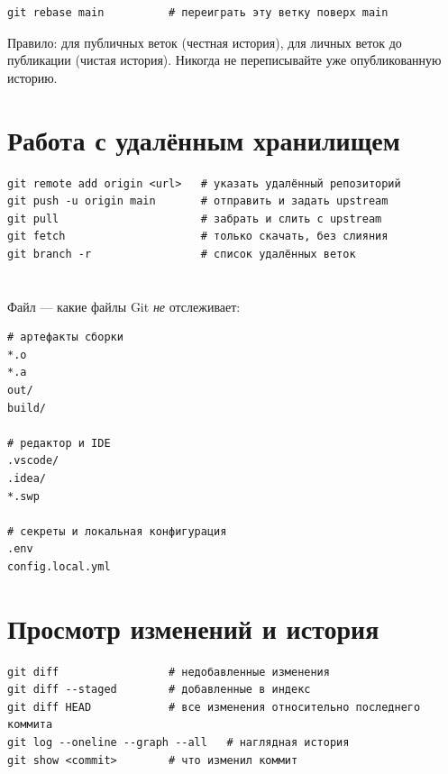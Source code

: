 \begin{verbatim}
git rebase main          # переиграть эту ветку поверх main
\end{verbatim}

\begin{tipbox}
Правило:  для публичных веток (честная
история),  для личных веток до
публикации (чистая история). Никогда не
переписывайте уже опубликованную историю.
\end{tipbox}

\section{Работа с удалённым хранилищем}

\begin{verbatim}
git remote add origin <url>   # указать удалённый репозиторий
git push -u origin main       # отправить и задать upstream
git pull                      # забрать и слить с upstream
git fetch                     # только скачать, без слияния
git branch -r                 # список удалённых веток
\end{verbatim}

\section{}

Файл  --- какие файлы Git
\emph{не} отслеживает:
\begin{verbatim}
# артефакты сборки
*.o
*.a
out/
build/

# редактор и IDE
.vscode/
.idea/
*.swp

# секреты и локальная конфигурация
.env
config.local.yml
\end{verbatim}

\section{Просмотр изменений и история}

\begin{verbatim}
git diff                 # недобавленные изменения
git diff --staged        # добавленные в индекс
git diff HEAD            # все изменения относительно последнего коммита
git log --oneline --graph --all   # наглядная история
git show <commit>        # что изменил коммит
\end{verbatim}

